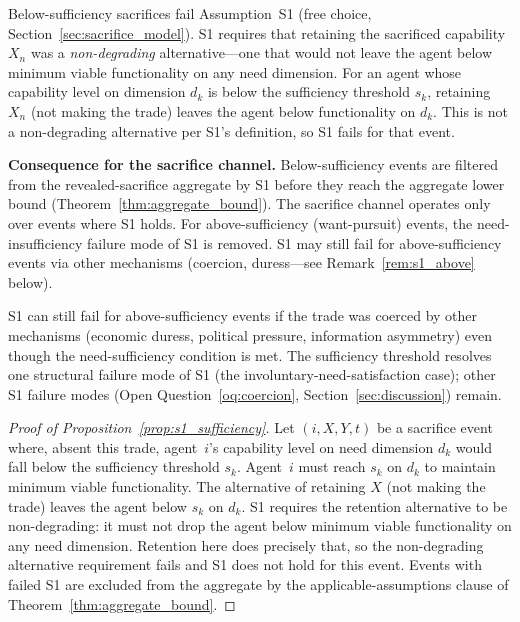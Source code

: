 \begin{proposition}
\label{prop:s1_sufficiency}
Below-sufficiency sacrifices fail Assumption~S1 (free choice,
Section~\ref{sec:sacrifice_model}).  S1 requires that retaining
the sacrificed capability $X_n$ was a \emph{non-degrading}
alternative---one that would not leave the agent below minimum
viable functionality on any need dimension.  For an agent whose
capability level on dimension $d_k$ is below the sufficiency
threshold $s_k$, retaining $X_n$ (not making the trade) leaves
the agent below functionality on $d_k$.  This is not a
non-degrading alternative per S1's definition, so S1 fails for
that event.
\end{proposition}

\noindent\textbf{Consequence for the sacrifice channel.}
Below-sufficiency events are filtered from the revealed-sacrifice
aggregate by S1 before they reach the aggregate lower bound
(Theorem~\ref{thm:aggregate_bound}).  The sacrifice channel
operates only over events where S1 holds.  For above-sufficiency
(want-pursuit) events, the need-insufficiency failure mode of S1
is removed.  S1 may still fail for above-sufficiency events via
other mechanisms (coercion, duress---see
Remark~\ref{rem:s1_above} below).

\begin{remark}
\label{rem:s1_above}
S1 can still fail for above-sufficiency events if the trade was
coerced by other mechanisms (economic duress, political pressure,
information asymmetry) even though the need-sufficiency condition
is met.  The sufficiency threshold resolves one structural failure
mode of S1 (the involuntary-need-satisfaction case); other S1
failure modes (Open Question~\ref{oq:coercion},
Section~\ref{sec:discussion}) remain.
\end{remark}

\begin{proof}[Proof of Proposition~\ref{prop:s1_sufficiency}]
Let $(i, X, Y, t)$ be a sacrifice event where, absent this trade,
agent~$i$'s capability level on need dimension $d_k$ would fall
below the sufficiency threshold $s_k$.  Agent~$i$ must reach
$s_k$ on $d_k$ to maintain minimum viable functionality.  The
alternative of retaining $X$ (not making the trade) leaves the
agent below $s_k$ on $d_k$.  S1 requires the retention
alternative to be non-degrading: it must not drop the agent below
minimum viable functionality on any need dimension.  Retention
here does precisely that, so the non-degrading alternative
requirement fails and S1 does not hold for this event.  Events
with failed S1 are excluded from the aggregate by the
applicable-assumptions clause of
Theorem~\ref{thm:aggregate_bound}.
\end{proof}

